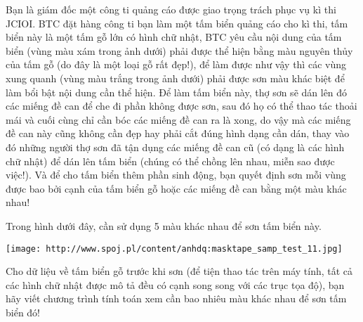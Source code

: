 Bạn là giám đốc một công ti quảng cáo được giao trọng trách phục vụ kì thi JCIOI. BTC đặt hàng công ti bạn làm một tấm biển quảng cáo cho kì thi, tấm biển này là một tấm gỗ lớn có hình chữ nhật, BTC yêu cầu nội dung của tấm biển (vùng màu xám trong ảnh dưới) phải được thể hiện bằng màu nguyên thủy của tấm gỗ (do đây là một loại gỗ rất đẹp!), để làm được như vậy thì các vùng xung quanh (vùng màu trắng trong ảnh dưới) phải được sơn màu khác biệt để làm bổi bật nội dung cần thể hiện. Để làm tấm biển này, thợ sơn sẽ dán lên đó các miếng đề can để che đi phần không được sơn, sau đó họ có thể thao tác thoải mái và cuối cùng chỉ cần bóc các miếng đề can ra là xong, do vậy mà các miếng đề can này cũng không cần đẹp hay phải cắt đúng hình dạng cần dán, thay vào đó những người thợ sơn đã tận dụng các miếng đề can cũ (có dạng là các hình chữ nhật) để dán lên tấm biển (chúng có thể chồng lên nhau, miễn sao được việc!). Và để cho tấm biển thêm phần sinh động, bạn quyết định sơn mỗi vùng được bao bởi cạnh của tấm biển gỗ hoặc các miếng đề can bằng một màu khác nhau!   


   Trong hình dưới đây, cần sử dụng 5 màu khác nhau để sơn tấm biển này.  


\texttt{[image: http://www.spoj.pl/content/anhdq:masktape\_samp\_test\_11.jpg]}



   Cho dữ liệu về tấm biển gỗ trước khi sơn (để tiện thao tác trên máy tính, tất cả các hình chữ nhật được mô tả đều có cạnh song song với các trục tọa độ), bạn hãy viết chương trình tính toán xem cần bao nhiêu màu khác nhau để sơn tấm biển đó!